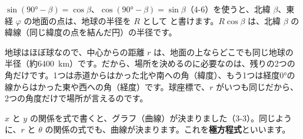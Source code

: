 \par\vspace{4pt}
$\sin(90°-\beta)=\cos\beta$、$\cos(90°-\beta)=\sin\beta$（4-6）を使うと、北緯 $\beta$、東経 $\varphi$ の地面の点は、地球の半径を $R$ として
と書けます。$R\cos\beta$ は、北緯 $\beta$ の緯線（同じ緯度の点を結んだ円）の半径です。

地球はほぼ球なので、中心からの距離 $r$ は、地面の上ならどこでも同じ地球の半径（約\qty{6400}{km}）です。だから、場所を決めるのに必要なのは、残りの2つの角だけです。1つは赤道からはかった北や南への角（緯度）、もう1つは経度0°の線からはかった東や西への角（経度）です。球座標で、$r$ がいつも同じだから、2つの角度だけで場所が言えるのです。


\leavevmode\label{bk:4-15:kyokuhou}$x$ と $y$ の関係を式で書くと、グラフ（曲線）が決まりました（3-3）。同じように、$r$ と $\theta$ の関係の式でも、曲線が決まります。これを\textbf{極方程式}といいます。

